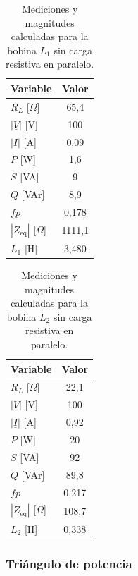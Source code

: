 \begin{table}[H]
    \centering
    \caption{Mediciones y magnitudes calculadas para la bobina $L_1$ sin carga resistiva en paralelo.}
    \label{tab:tp3_inductor_l1}
    \begin{tabular}{lc}
        \toprule
        Variable & Valor \\
        \midrule
        $R_L$ [$\Omega$] & 65,4 \\
        $|\underline{V}|$ [V] & 100 \\
        $|\underline{I}|$ [A] & 0,09 \\
        $P$ [W] & 1,6 \\
        $S$ [VA] & 9 \\
        $Q$ [VAr] & 8,9 \\
        $fp$ & 0,178 \\
        $|Z_{\text{eq}}|$ [$\Omega$] & 1111,1 \\
        $L_1$ [H] & 3,480 \\
        \bottomrule
    \end{tabular}
\end{table}

\begin{table}[H]
    \centering
    \caption{Mediciones y magnitudes calculadas para la bobina $L_2$ sin carga resistiva en paralelo.}
    \label{tab:tp3_inductor_l2}
    \begin{tabular}{lc}
        \toprule
        Variable & Valor \\
        \midrule
        $R_L$ [$\Omega$] & 22,1 \\
        $|\underline{V}|$ [V] & 100 \\
        $|\underline{I}|$ [A] & 0,92 \\
        $P$ [W] & 20 \\
        $S$ [VA] & 92 \\
        $Q$ [VAr] & 89,8 \\
        $fp$ & 0,217 \\
        $|Z_{\text{eq}}|$ [$\Omega$] & 108,7 \\
        $L_2$ [H] & 0,338 \\
        \bottomrule
    \end{tabular}
\end{table}

\subsubsection{Triángulo de potencia}

